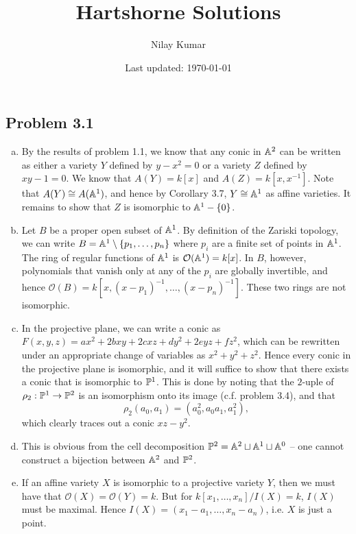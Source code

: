 \documentclass{../mathnotes}
\title{Hartshorne Solutions}
\author{Nilay Kumar}
\date{Last updated: \today}
\begin{document}
\maketitle

\subsection*{Problem 3.1}
\begin{enumerate}[(a)]
    \item By the results of problem 1.1, we know that any conic in $\mathbb{A}^2$ can be written as either
        a variety $Y$ defined by $y-x^2=0$ or a variety $Z$ defined by $xy-1=0$. We know that
        $A(Y)=k[x]$ and $A(Z)=k[x,x^{-1}]$. Note that $A(Y)\cong A(\mathbb{A}^1)$, and hence by Corollary
        3.7, $Y\cong\mathbb{A}^1$ as affine varieties. It remains to show that $Z$ is isomorphic to
        $\mathbb{A}^1-\{0\}$.
    \item Let $B$ be a proper open subset of $\mathbb{A}^1$. By definition of the Zariski topology, we can
        write $B=\mathbb{A}^1\setminus\{p_1,\ldots, p_n\}$ where $p_i$ are a finite set of points in $\mathbb{A}^1$.
        The ring of regular functions of $\mathbb{A}^1$ is $\mathcal{O}(\mathbb{A}^1)=k[x]$. In $B$, however,
        polynomials that vanish only at any of the $p_i$ are globally invertible, and hence
        $\mathcal{O}(B)=k[x,(x-p_1)^{-1},\ldots,(x-p_n)^{-1}]$. These two rings are
        not isomorphic.
    \item In the projective plane, we can write a conic as $F(x,y,z)=ax^2+2bxy+2cxz+dy^2+2eyz+fz^2$,
        which can be rewritten under an appropriate change of variables as $x^2+y^2+z^2$. Hence every
        conic in the projective plane is isomorphic, and it will suffice to show that there exists
        a conic that is isomorphic to $\mathbb{P}^1$. This is done by noting that the $2$-uple of
        $\rho_2:\mathbb{P}^1\to\mathbb{P}^2$ is an isomorphism onto its image (c.f. problem 3.4), and that
        \[\rho_2(a_0,a_1)=(a_0^2,a_0a_1,a_1^2),\]
        which clearly traces out a conic $xz-y^2$.
    \item This is obvious from the cell decomposition $\mathbb{P}^2=\mathbb{A}^2\sqcup\mathbb{A}^1\sqcup\mathbb{A}^0$ -- one
        cannot construct a bijection between $\mathbb{A}^2$ and $\mathbb{P}^2$.
    \item If an affine variety $X$ is isomorphic to a projective variety $Y$, then we must have
        that $\mathcal{O}(X)=\mathcal{O}(Y)=k$. But for $k[x_1,\ldots,x_n]/I(X)=k$, $I(X)$
        must be maximal. Hence $I(X)=(x_1-a_1,\ldots,x_n-a_n)$, i.e. $X$ is just a point.
\end{enumerate}
\end{document}
